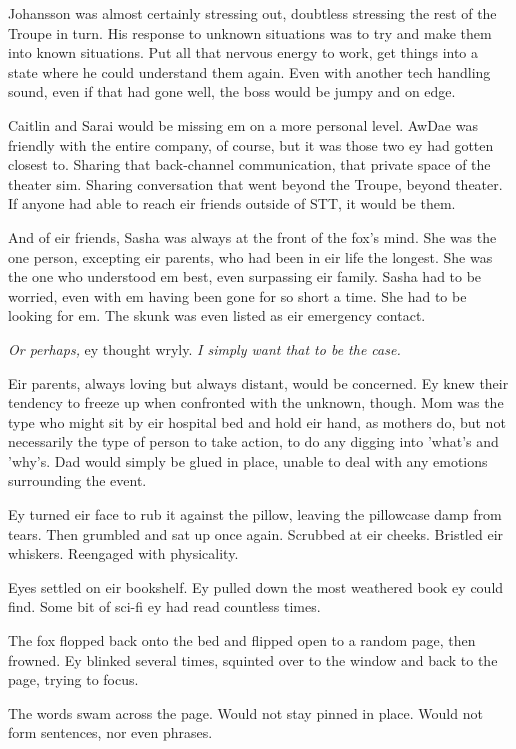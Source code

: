 Johansson was almost certainly stressing out, doubtless stressing the rest of the Troupe in turn. His response to unknown situations was to try and make them into known situations. Put all that nervous energy to work, get things into a state where he could understand them again. Even with another tech handling sound, even if that had gone well, the boss would be jumpy and on edge.

Caitlin and Sarai would be missing em on a more personal level. AwDae was friendly with the entire company, of course, but it was those two ey had gotten closest to. Sharing that back-channel communication, that private space of the theater sim. Sharing conversation that went beyond the Troupe, beyond theater. If anyone had able to reach eir friends outside of STT, it would be them.

And of eir friends, Sasha was always at the front of the fox's mind. She was the one person, excepting eir parents, who had been in eir life the longest. She was the one who understood em best, even surpassing eir family. Sasha had to be worried, even with em having been gone for so short a time. She had to be looking for em. The skunk was even listed as eir emergency contact.

\emph{Or perhaps,} ey thought wryly. \emph{I simply want that to be the case.}

Eir parents, always loving but always distant, would be concerned. Ey knew their tendency to freeze up when confronted with the unknown, though. Mom was the type who might sit by eir hospital bed and hold eir hand, as mothers do, but not necessarily the type of person to take action, to do any digging into 'what's and 'why's. Dad would simply be glued in place, unable to deal with any emotions surrounding the event.

Ey turned eir face to rub it against the pillow, leaving the pillowcase damp from tears. Then grumbled and sat up once again. Scrubbed at eir cheeks. Bristled eir whiskers. Reengaged with physicality.

Eyes settled on eir bookshelf. Ey pulled down the most weathered book ey could find. Some bit of sci-fi ey had read countless times.

The fox flopped back onto the bed and flipped open to a random page, then frowned. Ey blinked several times, squinted over to the window and back to the page, trying to focus.

The words swam across the page. Would not stay pinned in place. Would not form sentences, nor even phrases.

